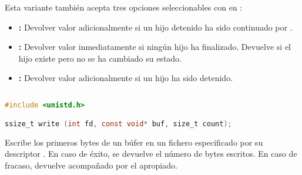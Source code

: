 Esta variante también acepta tres opciones seleccionables con  en :

\begin{itemize}
	\item{}\textbf{:} Devolver valor adicionalmente si un hijo detenido ha sido continuado por .
	\item{}\textbf{:} Devolver valor inmediatamente si ningún hijo ha finalizado. Devuelve  si el hijo  existe pero no se ha cambiado su estado.
	\item{}\textbf{:} Devolver valor adicionalmente si un hijo ha sido detenido.
\end{itemize}

\subsection{}\label{write}

\begin{lstlisting}[language=C]
#include <unistd.h>

ssize_t write (int fd, const void* buf, size_t count);
\end{lstlisting}

Escribe los  primeros bytes de un búfer  en un fichero especificado por su descriptor .
En caso de éxito, se devuelve el número de bytes escritos.
En caso de fracaso, devuelve  acompañado por el  apropiado.
